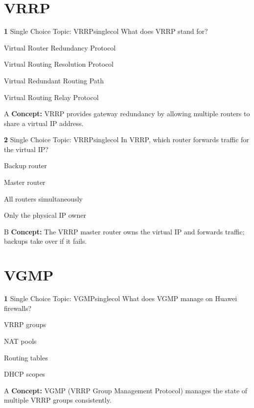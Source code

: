 \documentclass[10pt,a4paper]{article}
\begin{document}
\section{VRRP}
\begin{qcard}{\color{white}\textbf{1} \hfill \small Single Choice \textbar{} Topic: VRRP}{singlecol}
What does VRRP stand for?

\begin{qoptions}
\item Virtual Router Redundancy Protocol
\item Virtual Routing Resolution Protocol
\item Virtual Redundant Routing Path
\item Virtual Routing Relay Protocol
\end{qoptions}
\begin{explainbox}{A}
\textbf{Concept:} VRRP provides gateway redundancy by allowing multiple routers to share a virtual IP address.
\end{explainbox}
\end{qcard}

\begin{qcard}{\color{white}\textbf{2} \hfill \small Single Choice \textbar{} Topic: VRRP}{singlecol}
In VRRP, which router forwards traffic for the virtual IP?

\begin{qoptions}
\item Backup router
\item Master router
\item All routers simultaneously
\item Only the physical IP owner
\end{qoptions}
\begin{explainbox}{B}
\textbf{Concept:} The VRRP master router owns the virtual IP and forwards traffic; backups take over if it fails.
\end{explainbox}
\end{qcard}

\section{VGMP}
\begin{qcard}{\color{white}\textbf{1} \hfill \small Single Choice \textbar{} Topic: VGMP}{singlecol}
What does VGMP manage on Huawei firewalls?

\begin{qoptions}
\item VRRP groups
\item NAT pools
\item Routing tables
\item DHCP scopes
\end{qoptions}
\begin{explainbox}{A}
\textbf{Concept:} VGMP (VRRP Group Management Protocol) manages the state of multiple VRRP groups consistently.
\end{explainbox}
\end{qcard}
\end{document}
